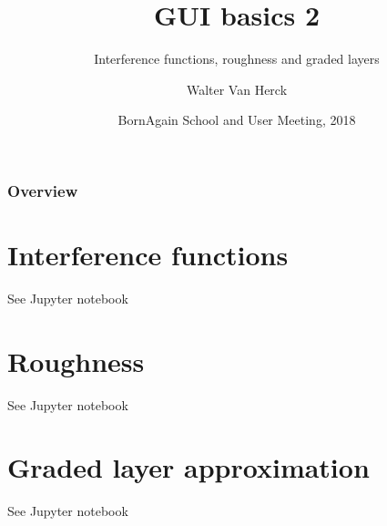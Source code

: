 \documentclass{beamer}
\title{GUI basics 2}
\subtitle{Interference functions, roughness and graded layers}
\author
{Walter Van Herck\inst{1}}
\institute[JCNS at MLZ] %
{
  \inst{1}%
  J\"ulich Centre for Neutron Science at MLZ
}
\date[BornAgain] %
{BornAgain School and User Meeting, 2018}
\begin{document}
\frame[plain]{\titlepage}

\begin{frame}
    \frametitle{Overview}
    \tableofcontents
\end{frame}

\section{Interference functions}

\begin{frame}
    \begin{center}
        See Jupyter notebook
    \end{center}
\end{frame}

\section{Roughness}

\begin{frame}
    \begin{center}
        See Jupyter notebook
    \end{center}
\end{frame}

\section{Graded layer approximation}

\begin{frame}
    \begin{center}
        See Jupyter notebook
    \end{center}
\end{frame}
\end{document}

